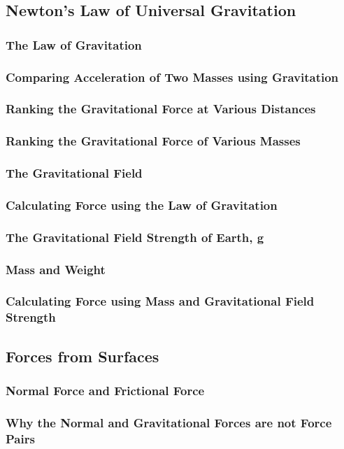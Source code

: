 \documentclass[../main-physics-problems.tex]{subfiles}
\begin{document}
\subsection{Newton’s Law of Universal Gravitation}
\subsubsection{The Law of Gravitation}
\subsubsection{Comparing Acceleration of Two Masses using Gravitation}
\subsubsection{Ranking the Gravitational Force at Various Distances}
\subsubsection{Ranking the Gravitational Force of Various Masses}
\subsubsection{The Gravitational Field}
\subsubsection{Calculating Force using the Law of Gravitation}
\subsubsection{The Gravitational Field Strength of Earth, g}
\subsubsection{Mass and Weight}
\subsubsection{Calculating Force using Mass and Gravitational Field Strength}
\subsection{Forces from Surfaces}
\subsubsection{Normal Force and Frictional Force}
\subsubsection{Why the Normal and Gravitational Forces are not Force Pairs}
\end{document}
